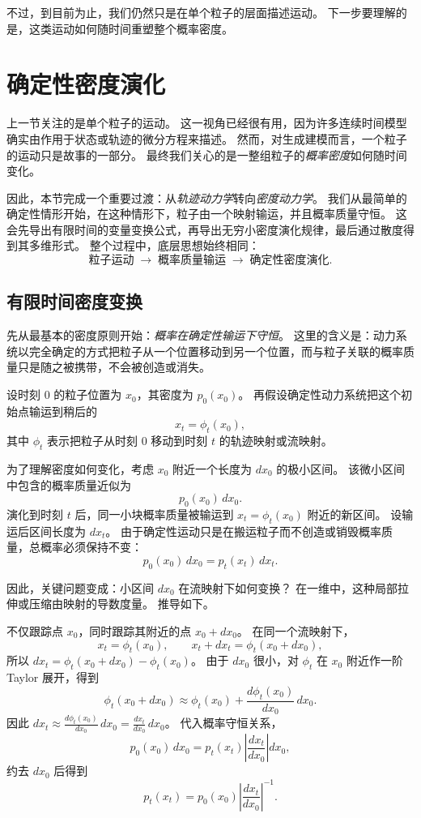 不过，到目前为止，我们仍然只是在单个粒子的层面描述运动。
下一步要理解的是，这类运动如何随时间重塑整个概率密度。



\section{确定性密度演化}

上一节关注的是单个粒子的运动。
这一视角已经很有用，因为许多连续时间模型确实由作用于状态或轨迹的微分方程来描述。
然而，对生成建模而言，一个粒子的运动只是故事的一部分。
最终我们关心的是一整组粒子的\emph{概率密度}如何随时间变化。

因此，本节完成一个重要过渡：从\emph{轨迹动力学}转向\emph{密度动力学}。
我们从最简单的确定性情形开始，在这种情形下，粒子由一个映射输运，并且概率质量守恒。
这会先导出有限时间的变量变换公式，再导出无穷小密度演化规律，最后通过散度得到其多维形式。
整个过程中，底层思想始终相同：
\[
\text{粒子运动}
\;\longrightarrow\;
\text{概率质量输运}
\;\longrightarrow\;
\text{确定性密度演化}.
\]

\subsection{有限时间密度变换}

先从最基本的密度原则开始：\emph{概率在确定性输运下守恒}。
这里的含义是：动力系统以完全确定的方式把粒子从一个位置移动到另一个位置，而与粒子关联的概率质量只是随之被携带，不会被创造或消失。

设时刻 $0$ 的粒子位置为 $x_0$，其密度为 $p_0(x_0)$。
再假设确定性动力系统把这个初始点输运到稍后的
\[
x_t=\phi_t(x_0),
\]
其中 $\phi_t$ 表示把粒子从时刻 $0$ 移动到时刻 $t$ 的轨迹映射或流映射。

为了理解密度如何变化，考虑 $x_0$ 附近一个长度为 $dx_0$ 的极小区间。
该微小区间中包含的概率质量近似为
\[
p_0(x_0)\,dx_0.
\]
演化到时刻 $t$ 后，同一小块概率质量被输运到 $x_t=\phi_t(x_0)$ 附近的新区间。
设输运后区间长度为 $dx_t$。
由于确定性运动只是在搬运粒子而不创造或销毁概率质量，总概率必须保持不变：
\[
p_0(x_0)\,dx_0=p_t(x_t)\,dx_t.
\]

因此，关键问题变成：小区间 $dx_0$ 在流映射下如何变换？
在一维中，这种局部拉伸或压缩由映射的导数度量。
推导如下。

\begin{tcolorbox}[
  colback=blue!4,
  colframe=blue!50!black,
  title={一维变量变换公式的推导},
  boxrule=0.6pt,
  arc=2mm,
  left=2mm,
  right=2mm,
  top=1mm,
  bottom=1mm
]
不仅跟踪点 $x_0$，同时跟踪其附近的点 $x_0+dx_0$。
在同一个流映射下，
\[
x_t=\phi_t(x_0), \qquad x_t+dx_t=\phi_t(x_0+dx_0),
\]
所以
$dx_t=\phi_t(x_0+dx_0)-\phi_t(x_0)$。
由于 $dx_0$ 很小，对 $\phi_t$ 在 $x_0$ 附近作一阶 Taylor 展开，得到
\[
\phi_t(x_0+dx_0)\approx \phi_t(x_0)+\frac{d\phi_t(x_0)}{dx_0}\,dx_0.
\]
因此
$dx_t\approx \frac{d\phi_t(x_0)}{dx_0}\,dx_0
= \frac{dx_t}{dx_0}\,dx_0$。
代入概率守恒关系，
\[
p_0(x_0)\,dx_0
=
p_t(x_t)\left|\frac{dx_t}{dx_0}\right|dx_0,
\]
约去 $dx_0$ 后得到
\[
\boxed{
p_t(x_t)=p_0(x_0)\left|\frac{dx_t}{dx_0}\right|^{-1}.
}
\]
\end{tcolorbox}

